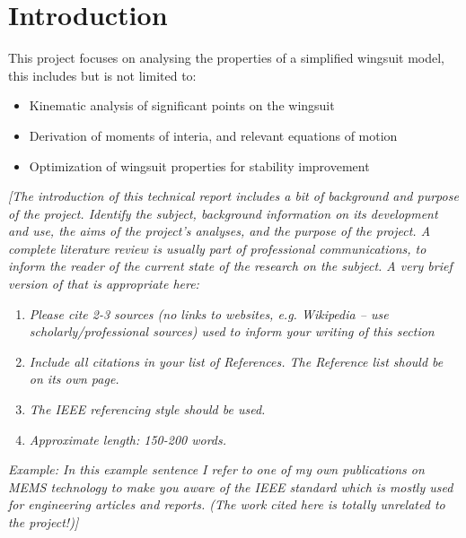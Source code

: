 \documentclass[11pt]{article}
\begin{document}
\section*{Introduction}
This project focuses on analysing the properties of a simplified wingsuit model, this includes but is not limited to:
\begin{itemize}
  \item Kinematic analysis of significant points on the wingsuit
  \item Derivation of moments of interia, and relevant equations of motion
  \item Optimization of wingsuit properties for stability improvement
\end{itemize}
\textcolor[rgb]{0.80,0.29,0.09}{\textsl{[The introduction of this technical report includes a bit of background and purpose of the project. Identify the subject, background information on its development and use, the aims of the project’s analyses, and the purpose of the project. A complete literature review is usually part of professional communications, to inform the reader of the current state of the research on the subject. A very brief version of that is appropriate here:}}
\begin{enumerate}
  \item \textcolor[rgb]{0.80,0.29,0.09}{\textsl{Please cite 2-3 sources (no links to websites, e.g. Wikipedia – use scholarly/professional sources) used to inform your writing of this section}}
  \item \textcolor[rgb]{0.80,0.29,0.09}{\textsl{Include all citations in your list of References. The Reference list should be on its own page.}}
  \item \textcolor[rgb]{0.80,0.29,0.09}{\textsl{The IEEE referencing style should be used.}}
  \item \textcolor[rgb]{0.80,0.29,0.09}{\textsl{Approximate length: 150-200 words.}}
\end{enumerate}
\textcolor[rgb]{0.80,0.29,0.09}{\textsl{Example: In this example sentence I refer to one of my own publications on MEMS technology \cite{gutschmidt2024} to make you aware of the IEEE standard \cite{IEEE} which is mostly used for engineering articles and reports. (The work cited here is totally unrelated to the project!)]}}


\end{document}
